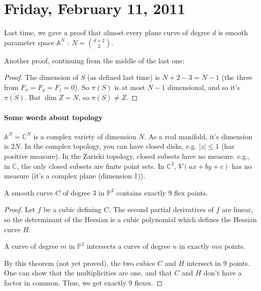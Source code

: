 \documentclass [letterpaper,11pt,twoside]{article}
\begin{document}
\setcounter {section}{3}\section {Friday, February 11, 2011}
  Last time, we gave a proof that almost every plane curve of degree $d$ is smooth parameter space $\mathbb A^N$ : $N = \binom{d+2}{2}$.

  Another proof, continuing from the middle of the last one:
  \begin{proof}
    The dimension of $S$ (as defined last time) is $N + 2 - 3 = N - 1$ (the three from $F_x = F_y = F_z = 0$).  So $\pi(S)$ is at most $N - 1$ dimensional, and so it's $\overline{\pi(S)}$.  But $\dim Z = N$, so $\overline{\pi(S)} \ne Z$.
  \end{proof}

  \paragraph{Some words about topology} $\mathbb A^N= \mathbb C^N$ is a complex variety of dimension $N$. As a real manifold, it's dimension is $2N$.
  In the complex topology, you can have closed disks, e.g. $|z| \le 1$ (has positive measure).  In the Zariski topology, closed subsets have no measure.  e.g., in $\mathbb C$, the only closed subsets are finite point sets.  In $\mathbb C^2$, $V(ax + by + c)$ has no measure (it's a complex plane (dimension 1)).

  \begin{prop*}
    A smooth curve $C$ of degree 3 in $\mathbb P^2$ contains exactly 9 flex points.
  \end{prop*}
  \begin{proof}
    Let $f$ be a cubic defining $C$.  The second partial derivatives of $f$ are linear, so the determinant of the Hessian is a cubic polynomial which defines the Hessian curve $H$.
    \begin{thm*}
      A curve of degree $m$ in $\mathbb{P}^2$ intersects a curve of degree $n$ in exactly $mn$ points.
    \end{thm*}
    By this theorem (not yet proved), the two cubics $C$ and $H$ intersect in 9 points.  One can show that the multiplicities are one, and that $C$ and $H$ don't have a factor in common.  Thus, we get exactly 9 flexes.
  \end{proof}
\end{document}
